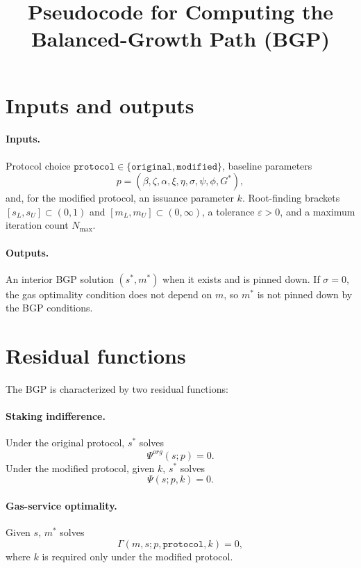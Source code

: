 \documentclass[11pt]{article}
\title{Pseudocode for Computing the Balanced-Growth Path (BGP)}
\date{}
\begin{document}
\maketitle

\section{Inputs and outputs}
\paragraph{Inputs.}
Protocol choice $\texttt{protocol}\in\{\texttt{original},\texttt{modified}\}$, baseline parameters
$$
p=(\beta,\zeta,\alpha,\xi,\eta,\sigma,\psi,\phi,G^*),
$$
and, for the modified protocol, an issuance parameter $k$.
Root-finding brackets $[s_L,s_U]\subset(0,1)$ and $[m_L,m_U]\subset(0,\infty)$, a tolerance $\varepsilon>0$, and a maximum iteration count $N_{\max}$.

\paragraph{Outputs.}
An interior BGP solution $(s^*,m^*)$ when it exists and is pinned down.
If $\sigma=0$, the gas optimality condition does not depend on $m$, so $m^*$ is not pinned down by the BGP conditions.

\section{Residual functions}
The BGP is characterized by two residual functions:

\paragraph{Staking indifference.}
Under the original protocol, $s^*$ solves
$$
\Psi^{org}(s;p)=0.
$$
Under the modified protocol, given $k$, $s^*$ solves
$$
\Psi(s;p,k)=0.
$$

\paragraph{Gas-service optimality.}
Given $s$, $m^*$ solves
$$
\Gamma(m,s;p,\texttt{protocol},k)=0,
$$
where $k$ is required only under the modified protocol.
\end{document}
